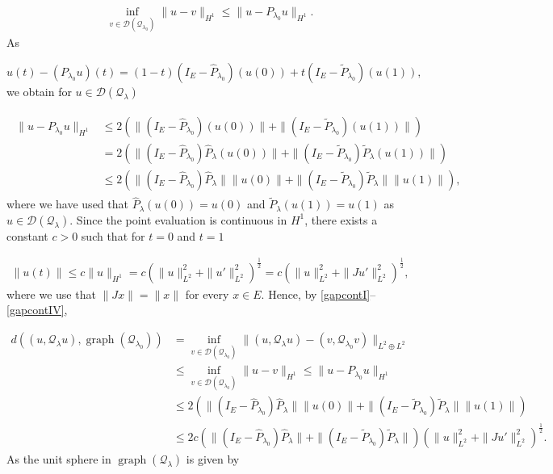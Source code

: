 \documentclass[a4paper,10pt]{article}
\DeclareMathOperator{\gra}{graph}
\begin{document}
\begin{align}\label{gapcontII}
\inf_{v\in\mathcal{D}(\mathcal{Q}_{\lambda_0})}\|u-v\|_{H^1}\leq\|u-P_{\lambda_0}u\|_{H^1}.
\end{align}
As 

\[u(t)-(P_{\lambda_0}u)(t)=(1-t)(I_E-\hat{P}_{\lambda_0})(u(0))+t(I_E-\tilde{P}_{\lambda_0})(u(1)),\]
we obtain for $u\in\mathcal{D}(\mathcal{Q}_\lambda)$

\begin{align}\label{gapcontIII}
\begin{split}
\|u-P_{\lambda_0}u\|_{H^1}&\leq 2(\|(I_E-\hat{P}_{\lambda_0})(u(0))\|+\|(I_E-\tilde{P}_{\lambda_0})(u(1))\|)\\
&= 2(\|(I_E-\hat{P}_{\lambda_0})\hat{P}_\lambda(u(0))\|+\|(I_E-\tilde{P}_{\lambda_0})\tilde{P}_\lambda(u(1))\|)\\
&\leq 2(\|(I_E-\hat{P}_{\lambda_0})\hat{P}_\lambda\|\|u(0)\|+\|(I_E-\tilde{P}_{\lambda_0})\tilde{P}_\lambda\|\|u(1)\|),
\end{split}
\end{align}
where we have used that $\hat{P}_\lambda(u(0))=u(0)$ and $\tilde{P}_\lambda(u(1))=u(1)$ as $u\in\mathcal{D}(\mathcal{Q}_\lambda)$. Since the point evaluation is continuous in $H^1$, there exists a constant $c>0$ such that for $t=0$ and $t=1$

\begin{align}\label{gapcontIV}
\|u(t)\|\leq c\|u\|_{H^1}=c\left(\|u\|^2_{L^2}+\|u'\|^2_{L^2}\right)^\frac{1}{2}=c\left(\|u\|^2_{L^2}+\|Ju'\|^2_{L^2}\right)^\frac{1}{2},
\end{align}
where we use that $\|Jx\|=\|x\|$ for every $x\in E$. Hence, by \eqref{gapcontI}--\eqref{gapcontIV},

\begin{align*}
d((u,\mathcal{Q}_\lambda u),\gra(\mathcal{Q}_{\lambda_0}))&=\inf_{v\in\mathcal{D}(\mathcal{Q}_{\lambda_0})}\|(u,\mathcal{Q}_\lambda u)-(v,\mathcal{Q}_{\lambda_0}v)\|_{L^2\oplus L^2}\\
&\leq \inf_{v\in\mathcal{D}(\mathcal{Q}_{\lambda_0})}\|u-v\|_{H^1}\leq\|u-P_{\lambda_0}u\|_{H^1}\\
&\leq 2(\|(I_E-\hat{P}_{\lambda_0})\hat{P}_\lambda\|\|u(0)\|+\|(I_E-\tilde{P}_{\lambda_0})\tilde{P}_\lambda\|\|u(1)\|)\\
&\leq 2c(\|(I_E-\hat{P}_{\lambda_0})\hat{P}_\lambda\|+\|(I_E-\tilde{P}_{\lambda_0})\tilde{P}_\lambda\|)(\|u\|^2_{L^2}+\|Ju'\|^2_{L^2})^\frac{1}{2}. 
\end{align*}
As the unit sphere in $\gra(\mathcal{Q}_\lambda)$ is given by 
\end{document}
